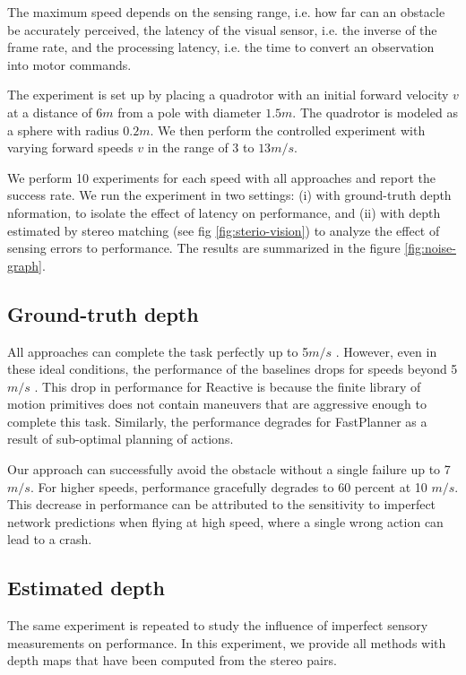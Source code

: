 The
maximum speed depends on the sensing range, i.e. how far can an
obstacle be accurately perceived, the latency of the visual sensor, i.e.
the inverse of the frame rate, and the processing latency, i.e. the time
to convert an observation into motor commands. 

The experiment is set up by placing a quadrotor with an initial
forward velocity $v$ at a distance of $6 m$ from a pole with diameter $1.5 m$.
The quadrotor is modeled as a sphere with radius $0.2 m$. We then perform the controlled experiment with varying
forward speeds $v$ in the range of 3 to $13 m/s$.

We perform 10
experiments for each speed with all approaches and report the success
rate. We run the experiment in two settings: (i) with ground-truth depth
nformation, to isolate the effect of latency on performance, and (ii)
with depth estimated by stereo matching (see fig \ref{fig:sterio-vision}) to analyze the effect of
sensing errors to performance.
The results are summarized in the figure \ref{fig:noise-graph}.

\subsection{Ground-truth depth}

All approaches can complete the
task perfectly up to 5$m/s$ . However, even in these ideal conditions,
the performance of the baselines drops for speeds beyond 5$m/s$ . This
drop in performance for Reactive is because the
finite library of motion primitives does not contain maneuvers that are aggressive enough to complete this task. Similarly, the performance
degrades for FastPlanner as a result of sub-optimal planning of actions.

Our approach can successfully avoid the obstacle without a
single failure up to 7 $m/s$. For higher speeds, performance gracefully degrades to 60 percent at 10 $m/s$. This decrease in performance can
be attributed to the sensitivity to imperfect network predictions when
flying at high speed, where a single wrong action can lead to a crash.

\subsection{Estimated depth}
The same experiment is repeated to study the influence of imperfect sensory measurements on performance. In this experiment, we provide all methods with depth maps that have been computed from
the stereo pairs.  

